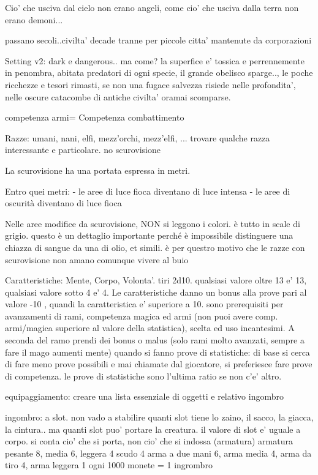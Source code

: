 \documentclass[12pt,a4paper,twoside,openany]{book}
\begin{document}
Cio' che usciva dal cielo non erano angeli, come cio' che usciva dalla terra non erano demoni...

passano secoli..civilta' decade tranne per piccole citta' mantenute da corporazioni


Setting v2: dark e dangerous.. ma come?
la superfice e'  tossica e perrennemente in penombra, abitata predatori di ogni specie, il grande obelisco sparge.., le poche ricchezze e tesori rimasti, se non una fugace salvezza risiede nelle profondita', nelle oscure catacombe di antiche civilta' oramai scomparse.

competenza armi= Competenza combattimento


Razze: umani, nani, elfi, mezz'orchi, mezz'elfi, ... trovare qualche razza interessante e particolare. no scurovisione  

La scurovisione ha una portata espressa in metri. 

Entro quei metri: 
- le aree di luce fioca diventano di luce intensa
- le aree di oscurità diventano di luce fioca

Nelle aree modifice da scurovisione, NON si leggono i colori.  è tutto in scale di grigio. questo è un dettaglio importante perché è impossibile distinguere una chiazza di sangue da una di olio, et simili. è per questro motivo che le razze con scurovisione non amano comunque vivere al buio

Caratteristiche: Mente, Corpo, Volonta'. tiri 2d10. qualsiasi valore oltre 13 e' 13, qualsiasi valore sotto 4 e' 4.
Le caratteristiche danno un bonus alla prove pari al valore -10 , quandi la caratteristica e' superiore a 10. sono prerequisiti per avanzamenti di rami, competenza magica ed armi (non puoi avere comp. armi/magica superiore al valore della statistica), scelta ed uso incantesimi. A seconda del ramo prendi dei bonus o malus (solo rami molto avanzati, sempre a fare il mago aumenti mente)
quando si fanno prove di statistiche: di base si cerca di fare meno prove possibili e mai chiamate dal giocatore, si preferiesce fare prove di competenza. le prove di statistiche sono l'ultima ratio se non c'e' altro.


equipaggiamento: creare una lista essenziale di oggetti e relativo ingombro

ingombro: a slot. non vado a stabilire quanti slot tiene lo zaino, il sacco, la giacca, la cintura.. ma quanti slot puo' portare la creatura. il valore di slot e' uguale a corpo. si conta cio' che si porta, non cio' che si indossa (armatura)
armatura pesante 8, media 6, leggera 4
scudo 4
arma a due mani 6, arma media 4, arma da tiro 4, arma leggera 1
ogni 1000 monete = 1 ingrombro
\end{document}
